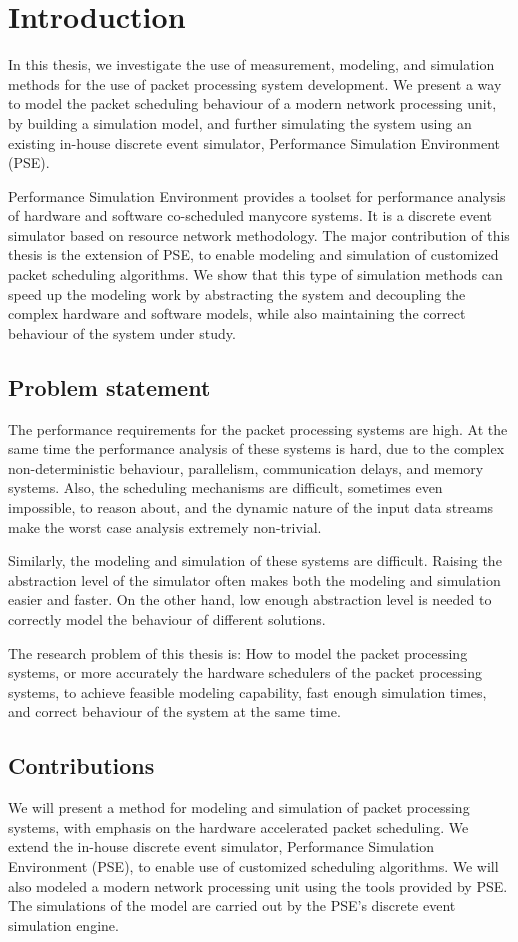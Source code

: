 \chapter{Introduction}
\label{chapter:intro}
In this thesis, we investigate the use of measurement, modeling, and simulation methods for the use of packet processing system development. We present a way to model the packet scheduling behaviour of a modern network processing unit, by building a simulation model, and further simulating the system using an existing in-house discrete event simulator, Performance Simulation Environment (PSE).

Performance Simulation Environment provides a toolset for performance analysis of hardware and software co-scheduled manycore systems. It is a discrete event simulator based on resource network methodology. The major contribution of this thesis is the extension of PSE, to enable modeling and simulation of customized packet scheduling algorithms. We show that this type of simulation methods can speed up the modeling work by abstracting the system and decoupling the complex hardware and software models, while also maintaining the correct behaviour of the system under study.

\section{Problem statement}
The performance requirements for the packet processing systems are high. At the same time the performance analysis of these systems is hard, due to the complex non-deterministic behaviour, parallelism, communication delays, and memory systems. Also, the scheduling mechanisms are difficult, sometimes even impossible, to reason about, and the dynamic nature of the input data streams make the worst case analysis extremely non-trivial.

Similarly, the modeling and simulation of these systems are difficult. Raising the abstraction level of the simulator often makes both the modeling and simulation easier and faster. On the other hand, low enough abstraction level is needed to correctly model the behaviour of different solutions.

The research problem of this thesis is: How to model the packet processing systems, or more accurately the hardware schedulers of the packet processing systems, to achieve feasible modeling capability, fast enough simulation times, and correct behaviour of the system at the same time.

\section{Contributions}
We will present a method for modeling and simulation of packet processing systems, with emphasis on the hardware accelerated packet scheduling. We extend the in-house discrete event simulator, Performance Simulation Environment (PSE), to enable use of customized scheduling algorithms. We will also modeled a modern network processing unit using the tools provided by PSE. The simulations of the model are carried out by the PSE's discrete event simulation engine.

